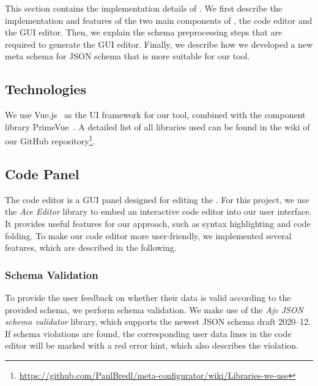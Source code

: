 This section contains the implementation details of \toolname{}.
We first describe the implementation and features of the two main components of \toolname{}, the code editor and the GUI editor.
Then, we explain the schema preprocessing steps that are required to generate the GUI editor.
Finally, we describe how we developed a new meta schema for JSON schema that is more suitable for our tool.

\subsection{Technologies}\label{subsec:technologies}

We use Vue.js~\cite{vuejsVuejsProgressive} as the UI framework for our tool, combined with the component library PrimeVue~\cite{primevuePrimeVueComponent}.
A detailed list of all libraries used can be found in the wiki of our GitHub repository\footnote{\url{https://github.com/PaulBredl/meta-configurator/wiki/Libraries-we-use}}.




\subsection{Code Panel}\label{subsec:code-editor}

The code editor is a GUI panel designed for editing the \cfgfiles.
For this project, we use the \textit{Ace Editor}\cite{Ace-Editor} library to embed an interactive code editor into our user interface.
It provides useful features for our approach, such as syntax highlighting and code folding.
To make our code editor more user-friendly, we implemented several features, which are described in the following.

\subsubsection{Schema Validation}
To provide the user feedback on whether their data is valid according to the provided schema, we perform schema validation.
We make use of the \textit{Ajv JSON schema validator}\cite{ajv-validator} library, which supports the newest JSON schema draft 2020--12.
If schema violations are found, the corresponding user data lines in the code editor will be marked with a red error hint, which also describes the violation.


